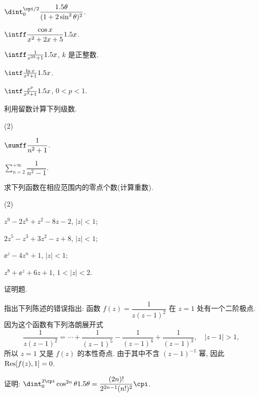 \begin{homework}
\begin{homework}
\begin{subhomework}
          \item $\dint_0^{\cpi/2}\dfrac{\d \theta}{(1+2\sin^2\theta)^2}$.
          \item $\intff \dfrac{\cos x}{x^2+2x+5}\d x$.
          \item $\intff \frac{1}{x^{2k}+1}\d x$, $k$ 是正整数.
          \item $\intf\frac{\ln x}{x^2+1}\d x$.
          \item $\intf\frac{x^p}{x^2+1}\d x$, $0<p<1$.
        \end{subhomework}
      \item \optionalex 利用留数计算下列级数.
        \begin{subhomework}(2)
          \item $\sumff \dfrac1{n^2+1}$.
          \item $\displaystyle\sum_{n=2}^{+\infty} \dfrac1{n^2-1}$.
        \end{subhomework}
      \item \optionalex 求下列函数在相应范围内的零点个数(计算重数).
        \begin{subhomework}(2)
          \item $z^9-2z^6+z^2-8z-2$, $|z|<1$;
          \item $2z^5-z^3+3z^2-z+8$, $|z|<1$;
          \item $\ee^z-4z^n+1$, $|z|<1$;
          \item $z^8+\ee^z+6z+1$, $1<|z|<2$.
        \end{subhomework}
  \end{homework}
  \item 证明题.
  \begin{homework}
    \item 指出下列陈述的错误指出: 函数 $f(z)=\dfrac1{z(z-1)^2}$ 在 $z=1$ 处有一个二阶极点. 因为这个函数有下列洛朗展开式
      \[
        \frac1{z(z-1)^2}=\cdots+\frac1{(z-1)^5}-\frac1{(z-1)^4}+\frac1{(z-1)^3},\quad|z-1|>1,
      \]
      所以 $z=1$ 又是 $f(z)$ 的本性奇点. 由于其中不含 $(z-1)^{-1}$ 幂, 因此 ${\mathrm{Res}}[f(z),1]=0$.
    \item 证明: $\dint_0^{2\cpi}\cos^{2n}\theta\d \theta=\dfrac{(2n)!}{2^{2n-1}(n!)^2}\cpi$.
  \end{homework}
\end{homework}


















